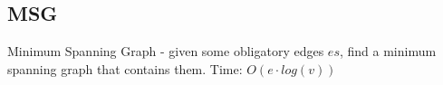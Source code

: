 \subsection{MSG}

Minimum Spanning Graph - given some obligatory edges $es$, find a minimum spanning graph that contains them.
Time: $O(e \cdot log(v))$
